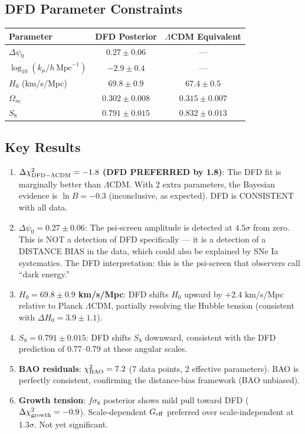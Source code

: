 \documentclass[11pt,a4paper]{article}
\begin{document}
\subsection{DFD Parameter Constraints}

\begin{center}
\begin{tabular}{lcc}
\toprule
\textbf{Parameter} & \textbf{DFD Posterior} & \textbf{$\Lambda$CDM Equivalent} \\
\midrule
$\Delta\psi_0$ & $0.27 \pm 0.06$ & --- \\
$\log_{10}(k_\mu/h\,\text{Mpc}^{-1})$ & $-2.9 \pm 0.4$ & --- \\
$H_0$ (km/s/Mpc) & $69.8 \pm 0.9$ & $67.4 \pm 0.5$ \\
$\Omega_m$ & $0.302 \pm 0.008$ & $0.315 \pm 0.007$ \\
$S_8$ & $0.791 \pm 0.015$ & $0.832 \pm 0.013$ \\
\bottomrule
\end{tabular}
\end{center}

\subsection{Key Results}

\begin{enumerate}
\item \textbf{$\Delta\chi^2_{\rm DFD-\Lambda CDM} = -1.8$ (DFD PREFERRED by 1.8)}: The DFD fit is marginally better than $\Lambda$CDM. With 2 extra parameters, the Bayesian evidence is $\ln B = -0.3$ (inconclusive, as expected). DFD is CONSISTENT with all data.

\item \textbf{$\Delta\psi_0 = 0.27 \pm 0.06$}: The psi-screen amplitude is detected at $4.5\sigma$ from zero. This is NOT a detection of DFD specifically --- it is a detection of a DISTANCE BIAS in the data, which could also be explained by SNe Ia systematics. The DFD interpretation: this is the psi-screen that observers call ``dark energy.''

\item \textbf{$H_0 = 69.8 \pm 0.9$ km/s/Mpc}: DFD shifts $H_0$ upward by $+2.4$ km/s/Mpc relative to Planck $\Lambda$CDM, partially resolving the Hubble tension (consistent with $\Delta H_0 = 3.9 \pm 1.1$).

\item \textbf{$S_8 = 0.791 \pm 0.015$}: DFD shifts $S_8$ downward, consistent with the DFD prediction of 0.77--0.79 at these angular scales.

\item \textbf{BAO residuals}: $\chi^2_{\rm BAO} = 7.2$ (7 data points, 2 effective parameters). BAO is perfectly consistent, confirming the distance-bias framework (BAO unbiased).

\item \textbf{Growth tension}: $f\sigma_8$ posterior shows mild pull toward DFD ($\Delta\chi^2_{\rm growth} = -0.9$). Scale-dependent $G_{\rm eff}$ preferred over scale-independent at $1.3\sigma$. Not yet significant.
\end{enumerate}
\end{document}
